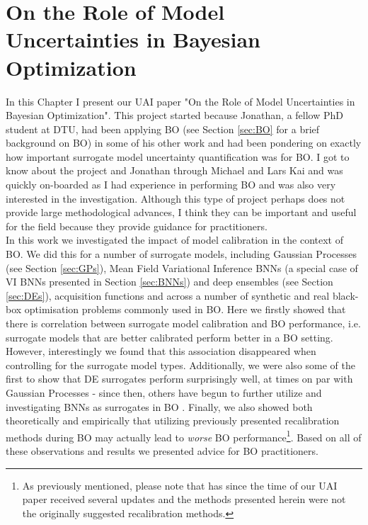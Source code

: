 \chapter{On the Role of Model Uncertainties in Bayesian Optimization}
\label{chap:UAI}
In this Chapter I present our UAI paper "On the Role of Model Uncertainties in Bayesian Optimization". This project started because Jonathan, a fellow PhD student at DTU, had been applying BO (see Section \ref{sec:BO} for a brief background on BO) in some of his other work and had been pondering on exactly how important surrogate model uncertainty quantification was for BO. I got to know about the project and Jonathan through Michael and Lars Kai and was quickly on-boarded as I had experience in performing BO and was also very interested in the investigation. Although this type of project perhaps does not provide large methodological advances, I think they can be important and useful for the field because they provide guidance for practitioners.\\

\noindent In this work we investigated the impact of model calibration in the context of BO. We did this for a number of surrogate models, including Gaussian Processes (see Section \ref{sec:GPs}), Mean Field Variational Inference BNNs (a special case of VI BNNs presented in Section \ref{sec:BNNs}) and deep ensembles (see Section \ref{sec:DEs}), acquisition functions and across a number of synthetic and real black-box optimisation problems commonly used in BO.  Here we firstly showed that there is correlation between surrogate model calibration and BO performance, i.e. surrogate models that are better calibrated perform better in a BO setting. However, interestingly we found that this association disappeared when controlling for the surrogate model types. Additionally, we were also some of the first to show that DE surrogates perform surprisingly well, at times on par with Gaussian Processes - since then, others have begun to further utilize and investigating BNNs as surrogates in BO \citep{li2024a}. Finally, we also showed both theoretically and empirically that utilizing previously presented recalibration methods \citep{recalibration_BO} during BO may actually lead to \textit{worse} BO performance\footnote{As previously mentioned, please note that \cite{recalibration_BO} has since the time of our UAI paper received several updates and the methods presented herein were not the originally suggested recalibration methods.}. Based on all of these observations and results we presented advice for BO practitioners.


